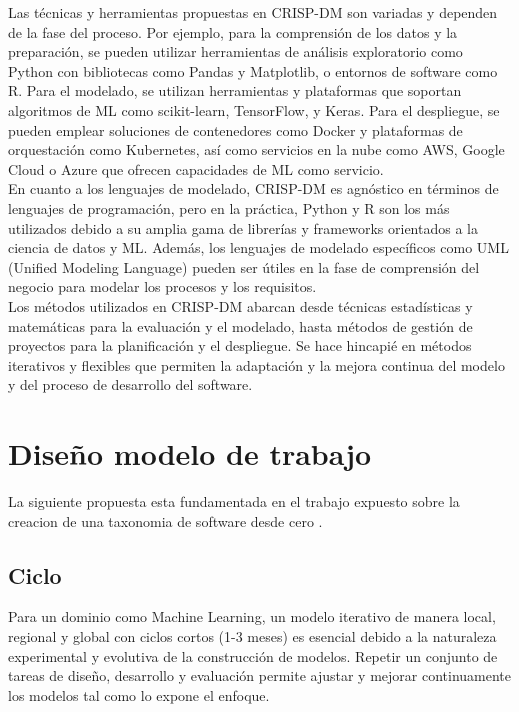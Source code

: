 \documentclass[journal]{IEEEtran}
\begin{document}
Las técnicas y herramientas propuestas en CRISP-DM son variadas y dependen de la fase del proceso. Por ejemplo, para la comprensión de los datos y la preparación, se pueden utilizar herramientas de análisis exploratorio como Python con bibliotecas como Pandas y Matplotlib, o entornos de software como R. Para el modelado, se utilizan herramientas y plataformas que soportan algoritmos de ML como scikit-learn, TensorFlow, y Keras. Para el despliegue, se pueden emplear soluciones de contenedores como Docker y plataformas de orquestación como Kubernetes, así como servicios en la nube como AWS, Google Cloud o Azure que ofrecen capacidades de ML como servicio.\\

En cuanto a los lenguajes de modelado, CRISP-DM es agnóstico en términos de lenguajes de programación, pero en la práctica, Python y R son los más utilizados debido a su amplia gama de librerías y frameworks orientados a la ciencia de datos y ML. Además, los lenguajes de modelado específicos como UML (Unified Modeling Language) pueden ser útiles en la fase de comprensión del negocio para modelar los procesos y los requisitos.\\

Los métodos utilizados en CRISP-DM abarcan desde técnicas estadísticas y matemáticas para la evaluación y el modelado, hasta métodos de gestión de proyectos para la planificación y el despliegue. Se hace hincapié en métodos iterativos y flexibles que permiten la adaptación y la mejora continua del modelo y del proceso de desarrollo del software.\\

\section{Diseño modelo de trabajo}

La siguiente propuesta esta fundamentada en el trabajo expuesto sobre la creacion de una taxonomia de software desde cero \cite{Cret2013}.

\subsection{Ciclo}

Para un dominio como Machine Learning, un modelo iterativo de manera local, regional y global con ciclos cortos (1-3 meses) es esencial debido a la naturaleza experimental y evolutiva de la construcción de modelos. Repetir un conjunto de tareas de diseño, desarrollo y evaluación permite ajustar y mejorar continuamente los modelos tal como lo expone el enfoque.\\
\end{document}
